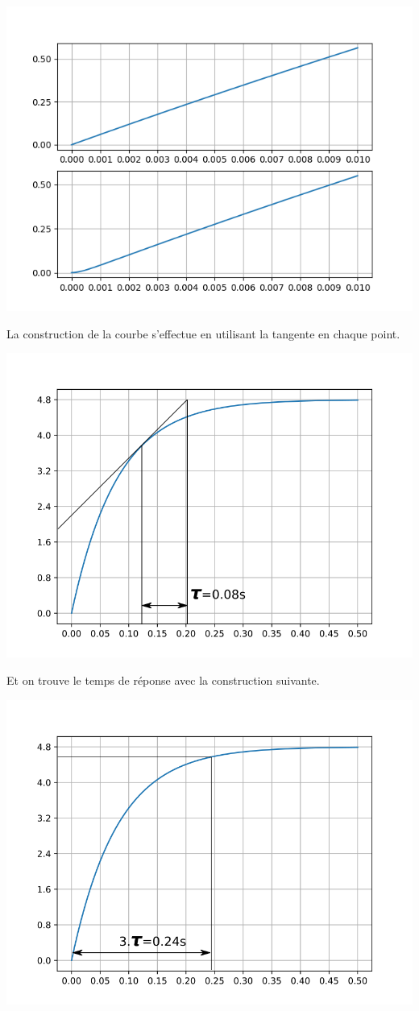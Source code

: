 \begin{center}
	\includegraphics[width=0.7\linewidth]{img/courbe1_2}
\end{center}

La construction de la courbe s'effectue en utilisant la tangente en chaque point.

\begin{center}
	\includegraphics[width=0.7\linewidth]{img/tau}
\end{center}

Et on trouve le temps de réponse avec la construction suivante.

\begin{center}
	\includegraphics[width=0.7\linewidth]{img/temps_rep}
\end{center}
	

